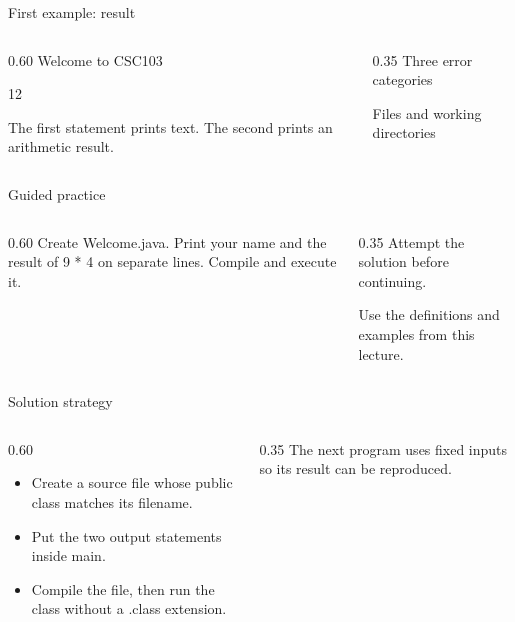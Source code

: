 \documentclass[10pt,aspectratio=169]{beamer}
\begin{document}
\begin{frame}[fragile,t]{First example: result}
\begin{columns}[T,onlytextwidth]\begin{column}{0.60\textwidth}
Welcome to CSC103\par 12\par The first statement prints text. The second prints an arithmetic result.
\end{column}\begin{column}{0.35\textwidth}\small
Three error categories

Files and working directories
\end{column}\end{columns}
\end{frame}

\begin{frame}[fragile,t]{Guided practice}
\begin{columns}[T,onlytextwidth]\begin{column}{0.60\textwidth}
Create Welcome.java. Print your name and the result of 9 * 4 on separate lines. Compile and execute it.
\end{column}\begin{column}{0.35\textwidth}\small
Attempt the solution before continuing.

Use the definitions and examples from this lecture.
\end{column}\end{columns}
\end{frame}

\begin{frame}[fragile,t]{Solution strategy}
\begin{columns}[T,onlytextwidth]\begin{column}{0.60\textwidth}
\begin{itemize}
\item Create a source file whose public class matches its filename.
\item Put the two output statements inside main.
\item Compile the file, then run the class without a .class extension.
\end{itemize}
\end{column}\begin{column}{0.35\textwidth}\small
The next program uses fixed inputs so its result can be reproduced.
\end{column}\end{columns}
\end{frame}
\end{document}
